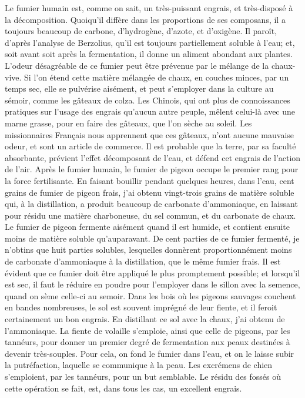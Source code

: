 Le fumier humain est, comme on sait, un très-puissant engrais, et très-disposé à la décomposition. Quoiqu'il diffère dans les proportions de ses composans, il a toujours beaucoup de carbone, d'hydrogène, d'azote, et d'oxigène. Il paroît, d'après l'analyse de Berzolius, qu'il est toujours partiellement soluble à l'eau; et, soit avant soit après la fermentation, il donne un aliment abondant aux plantes. L'odeur désagréable de ce fumier peut être prévenue par le mélange de la chaux-vive. Si l'on étend cette matière mélangée de chaux, en couches minces, par un temps sec, elle se pulvérise aisément,\setcounter{page}{198} et peut s'employer dans la culture au sémoir, comme les gâteaux de colza.
Les Chinois, qui ont plus de connoissances pratiques sur l'usage des engrais qu'aucun autre peuple, mêlent celui-là avec une marne grasse, pour en faire des gâteaux, que l'on sèche au soleil. Les missionnaires Français nous apprennent que ces gâteaux, n'ont aucune mauvaise odeur, et sont un article de commerce. Il est probable que la terre, par sa faculté absorbante, prévient l'effet décomposant de l'eau, et défend cet engrais de l'action de l'air.
Après le fumier humain, le fumier de pigeon occupe le premier rang pour la force fertilisante. En faisant bouillir pendant quelques heures, dans l'eau, cent grains de fumier de pigeon frais, j'ai obtenu vingt-trois grains de matière soluble qui, à la distillation, a produit beaucoup de carbonate d'ammoniaque, en laissant pour résidu une matière charboneuse, du sel commun, et du carbonate de chaux. Le fumier de pigeon fermente aisément quand il est humide, et contient ensuite moins de matière soluble qu'auparavant. De cent parties de ce fumier fermenté, je n'obtins que huit parties solubles, lesquelles donnèrent proportionnément moins de carbonate d'ammoniaque à\setcounter{page}{199} la distillation, que le même fumier frais.
Il est évident que ce fumier doit être appliqué le plus promptement possible; et lorsqu'il est sec, il faut le réduire en poudre pour l'employer dans le sillon avec la semence, quand on sème celle-ci au semoir.
Dans les bois où les pigeons sauvages couchent en bandes nombreuses, le sol est souvent imprégné de leur fiente, et il feroit certainement un bon engrais. En distillant ce sol avec la chaux, j'ai obtenu de l'ammoniaque.
La fiente de volaille s'emploie, ainsi que celle de pigeons, par les tannéurs, pour donner un premier degré de fermentation aux peaux destinées à devenir très-souples. Pour cela, on fond le fumier dans l'eau, et on le laisse subir la putréfaction, laquelle se communique à la peau. Les excrémens de chien s'emploient, par les tannéurs, pour un but semblable. Le résidu des fossés où cette opération se fait, est, dans tous les cas, un excellent engrais.

